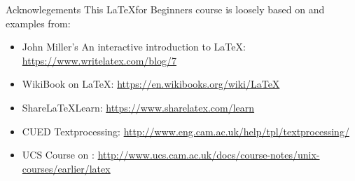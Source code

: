 \documentclass[10pt,times]{beamer}
\begin{document}
\begin{frame}{Acknowlegements}
This \LaTeX for Beginners course is loosely based on and examples from:
\begin{itemize}
\item John Miller's An interactive introduction to \LaTeX: 
\href{https://www.writelatex.com/blog/7}{https://www.writelatex.com/blog/7}
\item WikiBook on \LaTeX: 
\href{https://en.wikibooks.org/wiki/LaTeX}{https://en.wikibooks.org/wiki/LaTeX}
\item Share\LaTeX Learn: 
\href{https://www.sharelatex.com/learn}{https://www.sharelatex.com/learn}
\item CUED Textprocessing: \href{http://www.eng.cam.ac.uk/help/tpl/textprocessing/}{http://www.eng.cam.ac.uk/help/tpl/textprocessing/}
\item UCS Course on \LaTeXe: \href{http://www.ucs.cam.ac.uk/docs/course-notes/unix-courses/earlier/latex}{http://www.ucs.cam.ac.uk/docs/course-notes/unix-courses/earlier/latex}
\end{itemize}
\end{frame}
\end{document}
